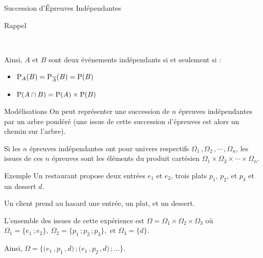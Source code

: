 \documentclass{cours}
\begin{document}
\begin{Gpartie}{Succession d'Épreuves Indépendantes}
\begin{Spartie}{Rappel}
\begin{center}
                \parbox{\linewidth}{} \\[2ex]
            \end{center}
            Ainsi, $A$ et $B$ sont deux événements indépendants si et seulement si :
            \begin{itemize}
                \item $\mathrm{P}_A(B)=\mathrm{P}_{\overline{A}}(B)=\mathrm{P}(B)$
                \item $\mathrm{P}(A\cap B)=\mathrm{P}(A)\times\mathrm{P}(B)$
            \end{itemize}
        \end{Spartie}
        \pagebreak
        \begin{Spartie}{Modélisations} 
            On peut représenter une succession de $n$ épreuves indépendantes par un arbre pondéré (une issue de cette succession d'épreuves est alors un chemin sur l'arbre).

            Si les $n$ épreuves indépendantes ont pour univers respectifs $\Omega_1\,,\Omega_2\,,\dotsb\,,\Omega_n$, les issues de ces $n$ épreuves sont les éléments du produit cartésien $\Omega_1\times\Omega_2\times\dotsb\times\Omega_n$.
        \end{Spartie}
        \begin{Spartie}{Exemple} 
            Un restaurant propose deux entrées $e_1$ et $e_2$, trois plats $p_1$, $p_2$, et $p_3$ et un dessert $d$.

            Un client prend au hasard une entrée, un plat, et un dessert.

            L'ensemble des issues de cette expérience est $\Omega=\Omega_1\times\Omega_2\times\Omega_3$ où $\Omega_1=\big\{e_1\,; e_2\big\},~\Omega_2=\big\{p_1\,; p_2\,; p_3\big\},\text{ et }\Omega_3=\big\{d\big\}$.

            Ainsi, $\Omega=\bigg\{\big(e_1\,, p_1\,, d\big)\,;\big(e_1\,, p_2\,, d\big)\,;\dotsc\bigg\}$.


\end{Spartie}
\end{Gpartie}
\end{document}
